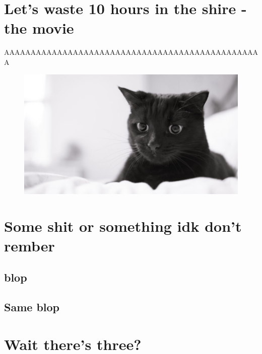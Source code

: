 \chapter{Let's waste 10 hours in the shire - the movie}
AAAAAAAAAAAAAAAAAAAAAAAAAAAAAAAAAAAAAAAAAAAAAAAAA

\begin{figure}
  \includegraphics[width=1\linewidth]{Images/tesla-cat.jpg}
\end{figure}

\chapter{Some shit or something idk don't rember}

\section{blop}

\section{Same blop}

\chapter{Wait there's three?}